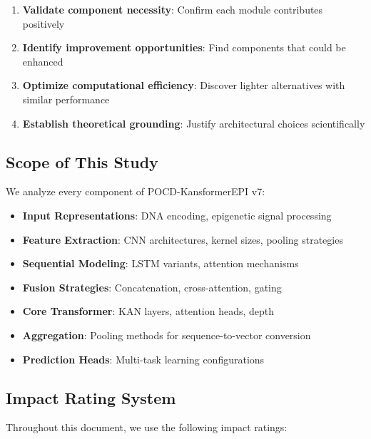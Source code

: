 \documentclass[11pt,a4paper]{article}
\begin{document}
\begin{enumerate}
    \item \textbf{Validate component necessity}: Confirm each module contributes positively
    \item \textbf{Identify improvement opportunities}: Find components that could be enhanced
    \item \textbf{Optimize computational efficiency}: Discover lighter alternatives with similar performance
    \item \textbf{Establish theoretical grounding}: Justify architectural choices scientifically
\end{enumerate}

\subsection{Scope of This Study}

We analyze every component of POCD-KansformerEPI v7:

\begin{itemize}
    \item \textbf{Input Representations}: DNA encoding, epigenetic signal processing
    \item \textbf{Feature Extraction}: CNN architectures, kernel sizes, pooling strategies
    \item \textbf{Sequential Modeling}: LSTM variants, attention mechanisms
    \item \textbf{Fusion Strategies}: Concatenation, cross-attention, gating
    \item \textbf{Core Transformer}: KAN layers, attention heads, depth
    \item \textbf{Aggregation}: Pooling methods for sequence-to-vector conversion
    \item \textbf{Prediction Heads}: Multi-task learning configurations
\end{itemize}

\subsection{Impact Rating System}

Throughout this document, we use the following impact ratings:
\end{document}
